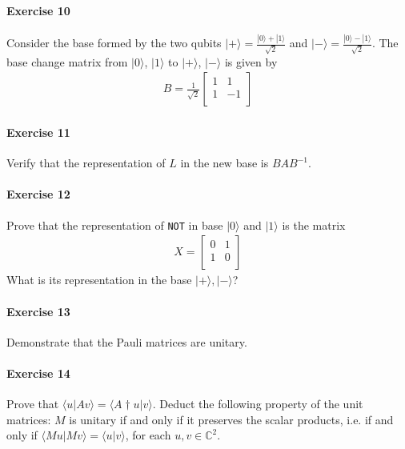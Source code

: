 \documentclass[a4paper,10pt]{article}
\begin{document}
\paragraph{Exercise 10}
\label{ex10q}
Consider the base formed by the two qubits $|+\rangle = \frac{|0\rangle + |1\rangle}{\sqrt{2}}$ and $|-\rangle = \frac{|0\rangle - |1\rangle}{\sqrt{2}}$. The base change matrix from $|0\rangle$, $|1\rangle$ to $|+\rangle$, $|-\rangle$ is given by
\begin{equation*}
\begin{aligned}
B = \frac{1}{\sqrt{2}}
{\begin{bmatrix}
1 & 1 \\
1 & -1 \\
\end{bmatrix}}
\end{aligned}
\end{equation*}

\paragraph{Exercise 11}
\label{ex11q}
Verify that the representation of $L$ in the new base is $BAB^{-1}$.

\paragraph{Exercise 12}
\label{ex12q}
Prove that the representation of \texttt{NOT} in base $|0\rangle$ and $|1\rangle$ is the matrix
\begin{equation*}
\begin{aligned}
X = {\begin{bmatrix}
0 & 1 \\
1 & 0 \\
\end{bmatrix}}
\end{aligned}
\end{equation*}
What is its representation in the base $|+\rangle, |-\rangle$?
\paragraph{Exercise 13}
\label{ex13q}
Demonstrate that the Pauli matrices are unitary.
\paragraph{Exercise 14}
\label{ex14q}
Prove that $\langle u|A v \rangle = \langle A\dagger u | v \rangle$. Deduct the following property of the unit matrices: $M$ is unitary if and only if it preserves the scalar products, i.e. if and only if $\langle Mu|Mv \rangle = \langle u|v \rangle$, for each $u, v \in \mathbb{C}^2$.
\end{document}
